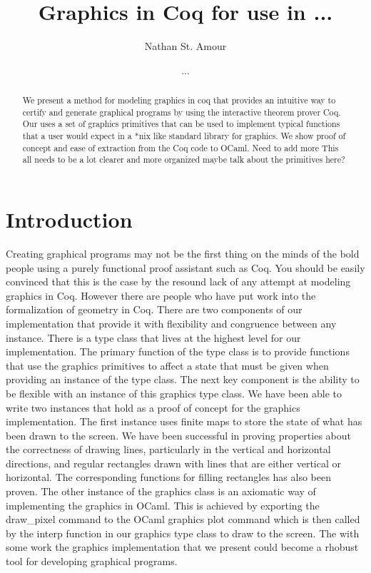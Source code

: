 \documentclass{llncs}
\begin{document}
\title{Graphics in Coq for use in ...}
\author{Nathan St. Amour \and ...}
\maketitle

\begin{abstract}
We present a method for modeling graphics in coq that provides an intuitive way to certify and generate graphical programs by using the interactive
theorem prover Coq.  Our uses a set of graphics primitives that can be used to implement typical functions that a user would expect in a *nix like
standard library for graphics.  We show proof of concept and ease of extraction from the Coq code to OCaml. {\color{red} Need to add more}
{\color{red} This all needs to be a lot clearer and more organized maybe talk about the primitives here?} 
\end{abstract}
\tableofcontents
\newpage

\section{Introduction}

Creating graphical programs may not be the first thing on the minds of the bold people using a purely functional proof assistant such as Coq.
You should be easily convinced that this is the case by the resound lack of any attempt at modeling graphics in Coq.  However there are people
who have put work into the formalization of geometry in Coq. There are two components of our implementation that provide it with flexibility and congruence between any instance. There is a type class that lives at the highest level for our implementation.  The primary function of the type class is to provide functions that use the graphics primitives to affect a state that must be given when providing an instance of the type class. The next key component is the ability to be flexible with an instance of this graphics type class.  We have been able to write two instances that hold as a proof of concept for the graphics implementation.  The first instance uses finite maps to store the state of what has been drawn to the screen.  We have been successful in proving properties about the correctness of drawing lines, particularly in the vertical and horizontal directions, and regular rectangles drawn with lines that are either vertical or horizontal.  The corresponding functions for filling rectangles has also been proven.  The other instance of the graphics class is an axiomatic way of implementing the graphics in OCaml.  This is achieved by exporting the draw\_pixel command to the OCaml graphics plot command which is then called by the interp function in our graphics type class to draw to the screen.
The with some work the graphics implementation that we present could become a rhobust tool for developing graphical programs.
\end{document}
